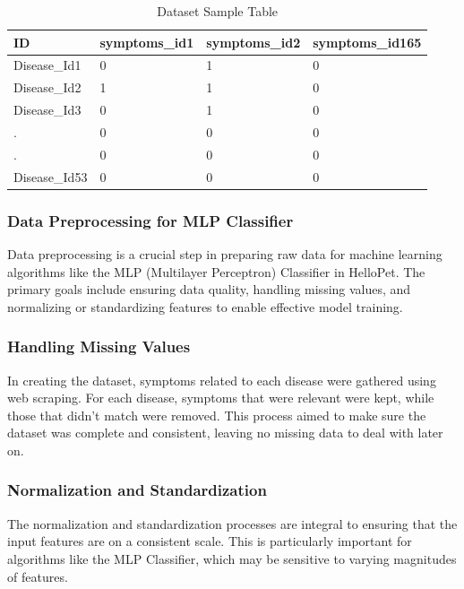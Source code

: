 \begin{table}[H] %
\centering
\caption{Dataset Sample Table}
\label{tab:example}
\begin{tabular}{|p{0.8in}|p{1in}|p{1in}|p{1.2in}|}
    \hline
    ID & \textbf{symptoms\_id1} & \textbf{symptoms\_id2} & \textbf{symptoms\_id165} \\
    \hline
    Disease\_Id1 & 0 & 1 & 0 \\
    \hline
    Disease\_Id2 & 1 & 1 & 0 \\
    \hline
    Disease\_Id3 & 0 & 1 & 0 \\
    \hline
    . & 0 & 0 & 0 \\
    \hline
    . & 0 & 0 & 0 \\
    \hline
    Disease\_Id53 & 0 & 0 & 0 \\
    \hline
\end{tabular}

\end{table}


\subsubsection{Data Preprocessing for MLP Classifier}
Data preprocessing is a crucial step in preparing raw data for machine learning algorithms like the MLP (Multilayer Perceptron) Classifier in HelloPet. The primary goals include ensuring data quality, handling missing values, and normalizing or standardizing features to enable effective model training.
\subsubsection{Handling Missing Values}
In creating the dataset, symptoms related to each disease were gathered using web scraping. For each disease, symptoms that were relevant were kept, while those that didn't match were removed. This process aimed to make sure the dataset was complete and consistent, leaving no missing data to deal with later on.
\subsubsection{Normalization and Standardization}
The normalization and standardization processes are integral to ensuring that the input features are on a consistent scale. This is particularly important for algorithms like the MLP Classifier, which may be sensitive to varying magnitudes of features.

